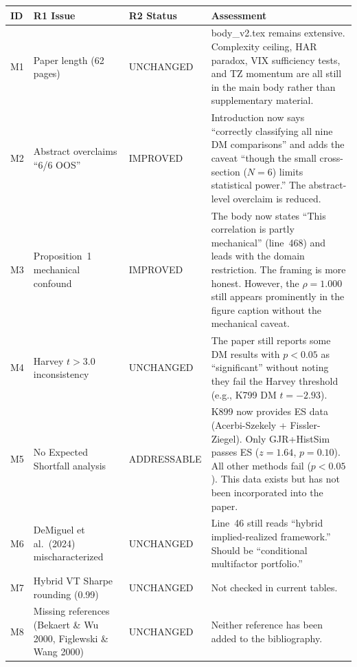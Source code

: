 \documentclass[12pt,a4paper]{article}
\begin{document}
\begin{longtable}{p{1cm}p{5cm}p{2.5cm}p{5.5cm}}
\toprule
\textbf{ID} & \textbf{R1 Issue} & \textbf{R2 Status} & \textbf{Assessment} \\
\midrule
\endfirsthead
M1 & Paper length (62 pages) & \textcolor{warncolor}{UNCHANGED} & body\_v2.tex remains extensive. Complexity ceiling, HAR paradox, VIX sufficiency tests, and TZ momentum are all still in the main body rather than supplementary material. \\
\addlinespace
M2 & Abstract overclaims ``6/6 OOS'' & \textcolor{okgreen}{IMPROVED} & Introduction now says ``correctly classifying all nine DM comparisons'' and adds the caveat ``though the small cross-section ($N = 6$) limits statistical power.'' The abstract-level overclaim is reduced. \\
\addlinespace
M3 & Proposition~1 mechanical confound & \textcolor{okgreen}{IMPROVED} & The body now states ``This correlation is partly mechanical'' (line~468) and leads with the domain restriction. The framing is more honest. However, the $\rho = 1.000$ still appears prominently in the figure caption without the mechanical caveat. \\
\addlinespace
M4 & Harvey $t > 3.0$ inconsistency & \textcolor{warncolor}{UNCHANGED} & The paper still reports some DM results with $p < 0.05$ as ``significant'' without noting they fail the Harvey threshold (e.g., K799 DM $t = -2.93$). \\
\addlinespace
M5 & No Expected Shortfall analysis & \textcolor{resolved}{ADDRESSABLE} & K899 now provides ES data (Acerbi-Szekely + Fissler-Ziegel). Only GJR+HistSim passes ES ($z = 1.64$, $p = 0.10$). All other methods fail ($p < 0.05$). This data exists but has not been incorporated into the paper. \\
\addlinespace
M6 & DeMiguel et al.\ (2024) mischaracterized & \textcolor{warncolor}{UNCHANGED} & Line~46 still reads ``hybrid implied-realized framework.'' Should be ``conditional multifactor portfolio.'' \\
\addlinespace
M7 & Hybrid VT Sharpe rounding (0.99) & \textcolor{warncolor}{UNCHANGED} & Not checked in current tables. \\
\addlinespace
M8 & Missing references (Bekaert \& Wu 2000, Figlewski \& Wang 2000) & \textcolor{warncolor}{UNCHANGED} & Neither reference has been added to the bibliography. \\
\bottomrule
\end{longtable}


\bigskip
\end{document}

